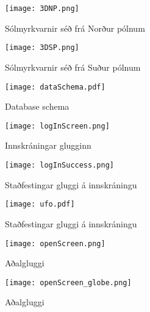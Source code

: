 \documentclass[12pt, git, final]{rureport}
\begin{document}
\begin{figure}
	\centering
	\texttt{[image: 3DNP.png]}
	\caption{Sólmyrkvarnir séð frá Norður pólnum}
	\label{fig:3DNP}
\end{figure}

\begin{figure}
	\centering
	\texttt{[image: 3DSP.png]}
	\caption{Sólmyrkvarnir séð frá Suður pólnum}
	\label{fig:3DSP}
\end{figure}

\begin{figure}
	\centering 
	\texttt{[image: dataSchema.pdf]}
	\caption{Database schema \label{fig:dataschema}}
\end{figure} 
%
\begin{figure}
	\centering 
	\texttt{[image: logInScreen.png]}
	\caption{Innskráningar glugginn \label{fig:logScreen}}
\end{figure} 

\begin{figure}
	\centering 
	\texttt{[image: logInSuccess.png]}
	\caption{Staðfestingar gluggi á innskráningu \label{fig:logsucces}}
\end{figure} 

\begin{figure}
	\centering 
	\texttt{[image: ufo.pdf]}
	\caption{Staðfestingar gluggi á innskráningu \label{fig:diagram}}
\end{figure}

\begin{figure}[t]
	\centering 
	\texttt{[image: openScreen.png]}
	\caption{Aðalgluggi \label{fig:openScreen}}
\end{figure} 
\begin{figure}[t]
	\centering 
	\texttt{[image: openScreen\_globe.png]}
	\caption{Aðalgluggi \label{fig:openScreen_globe}}
\end{figure} 

\clearpage

\printbibliography
\end{document}
